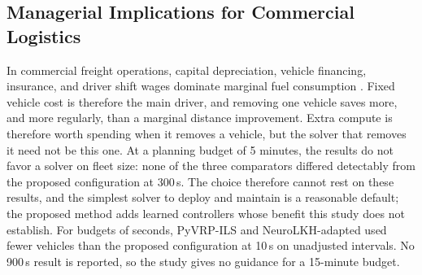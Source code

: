 \documentclass{ieeeaccess}
\begin{document}
\subsection{Managerial Implications for Commercial Logistics}
\label{sec:disc_managerial}

In commercial freight operations, capital depreciation, vehicle financing, insurance, and driver shift wages dominate marginal fuel consumption \cite{Toth2014, braysy2005vehicle}. Fixed vehicle cost is therefore the main driver, and removing one vehicle saves more, and more regularly, than a marginal distance improvement. Extra compute is therefore worth spending when it removes a vehicle, but the solver that removes it need not be this one. At a planning budget of 5 minutes, the results do not favor a solver on fleet size: none of the three comparators differed detectably from the proposed configuration at 300\,s. The choice therefore cannot rest on these results, and the simplest solver to deploy and maintain is a reasonable default; the proposed method adds learned controllers whose benefit this study does not establish. For budgets of seconds, PyVRP-ILS and NeuroLKH-adapted used fewer vehicles than the proposed configuration at 10\,s on unadjusted intervals. No 900\,s result is reported, so the study gives no guidance for a 15-minute budget.
\end{document}
